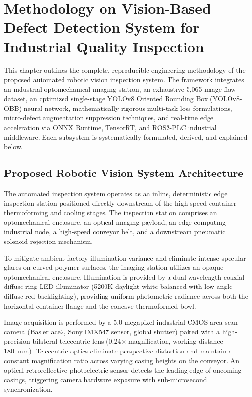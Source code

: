 \chapter{Methodology on Vision-Based Defect Detection System for Industrial Quality Inspection}
\label{ch:method}

This chapter outlines the complete, reproducible engineering methodology of the proposed automated robotic vision inspection system. The framework integrates an industrial optomechanical imaging station, an exhaustive 5,065-image flaw dataset, an optimized single-stage YOLOv8 Oriented Bounding Box (YOLOv8-OBB) neural network, mathematically rigorous multi-task loss formulations, micro-defect augmentation suppression techniques, and real-time edge acceleration via ONNX Runtime, TensorRT, and ROS2-PLC industrial middleware. Each subsystem is systematically formulated, derived, and explained below.

\section{Proposed Robotic Vision System Architecture}
\label{sec:architecture}

The automated inspection system operates as an inline, deterministic edge inspection station positioned directly downstream of the high-speed container thermoforming and cooling stages. The inspection station comprises an optomechanical enclosure, an optical imaging payload, an edge computing industrial node, a high-speed conveyor belt, and a downstream pneumatic solenoid rejection mechanism.

To mitigate ambient factory illumination variance and eliminate intense specular glares on curved polymer surfaces, the imaging station utilizes an opaque optomechanical enclosure. Illumination is provided by a dual-wavelength coaxial diffuse ring LED illuminator (5200K daylight white balanced with low-angle diffuse red backlighting), providing uniform photometric radiance across both the horizontal container flange and the concave thermoformed bowl.

Image acquisition is performed by a 5.0-megapixel industrial CMOS area-scan camera (Basler ace2, Sony IMX547 sensor, global shutter) paired with a high-precision bilateral telecentric lens (0.24$\times$ magnification, working distance 180~mm). Telecentric optics eliminate perspective distortion and maintain a constant magnification ratio across varying casing heights on the conveyor. An optical retroreflective photoelectric sensor detects the leading edge of oncoming casings, triggering camera hardware exposure with sub-microsecond synchronization.

